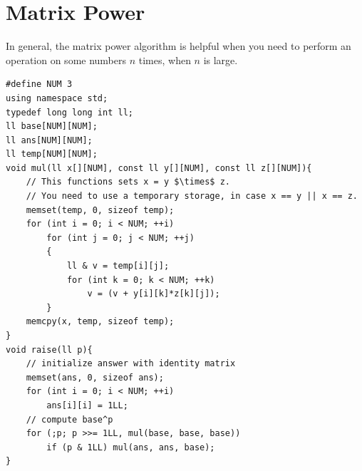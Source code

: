 \documentclass[12pt]{book}
\begin{document}
\section{Matrix Power}
In general, the matrix power algorithm is helpful when you need to perform an operation on some numbers $n$ times, when $n$ is large.
\begin{verbatim}
#define NUM 3
using namespace std;
typedef long long int ll;
ll base[NUM][NUM];
ll ans[NUM][NUM];
ll temp[NUM][NUM];
void mul(ll x[][NUM], const ll y[][NUM], const ll z[][NUM]){
	// This functions sets x = y $\times$ z.
	// You need to use a temporary storage, in case x == y || x == z.
	memset(temp, 0, sizeof temp);
	for (int i = 0; i < NUM; ++i)
		for (int j = 0; j < NUM; ++j)
		{
			ll & v = temp[i][j];
			for (int k = 0; k < NUM; ++k)
				v = (v + y[i][k]*z[k][j]);
		}
	memcpy(x, temp, sizeof temp);
}
void raise(ll p){
	// initialize answer with identity matrix
	memset(ans, 0, sizeof ans);
	for (int i = 0; i < NUM; ++i)
		ans[i][i] = 1LL;
	// compute base^p
	for (;p; p >>= 1LL, mul(base, base, base))
		if (p & 1LL) mul(ans, ans, base);
}
\end{verbatim}
\end{document}
